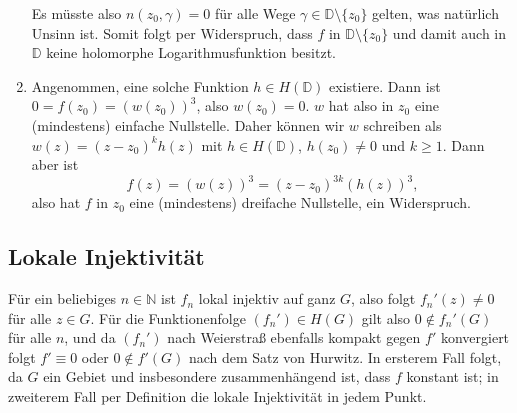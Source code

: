 \documentclass[a4paper]{article}
\begin{document}
\begin{enumerate}
\begin{equation*}
    \end{equation*}
    Es müsste also $n(z_0, \gamma) = 0$ für alle Wege $\gamma \in \mathds{D} \setminus \{z_0\}$ gelten, was natürlich Unsinn ist.
    Somit folgt per Widerspruch, dass $f$ in $\mathds{D} \setminus \{z_0\}$ und damit auch in $\mathds{D}$ keine holomorphe Logarithmusfunktion besitzt.
    \item Angenommen, eine solche Funktion $h \in H(\mathds{D})$ existiere.
    Dann ist $0 = f(z_0) = (w(z_0))^3$, also $w(z_0) = 0$.
    $w$ hat also in $z_0$ eine (mindestens) einfache Nullstelle.
    Daher können wir $w$ schreiben als $w(z) = (z-z_0)^k h(z)$ mit $h \in H(\mathds{D})$, $h(z_0) \neq 0$ und $k \geq 1$.
    Dann aber ist 
    \begin{equation*}
        f(z) = (w(z))^3 = (z-z_0)^{3k} (h(z))^3\text{,}
    \end{equation*}
    also hat $f$ in $z_0$ eine (mindestens) dreifache Nullstelle, ein Widerspruch.
\end{enumerate}


\subsection{Lokale Injektivität}

Für ein beliebiges $n \in \mathds{N}$ ist $f_n$ lokal injektiv auf ganz $G$, also folgt $f_n'(z) \neq 0$ für alle $z \in G$.
Für die Funktionenfolge $(f_n') \in H(G)$ gilt also $0 \notin f_n'(G)$ für alle $n$, und da $(f_n')$ nach Weierstraß ebenfalls kompakt gegen $f'$ konvergiert folgt $f' \equiv 0$ oder $0 \notin f'(G)$ nach dem Satz von Hurwitz.
In ersterem Fall folgt, da $G$ ein Gebiet und insbesondere zusammenhängend ist, dass $f$ konstant ist; in zweiterem Fall per Definition die lokale Injektivität in jedem Punkt.
\end{document}
